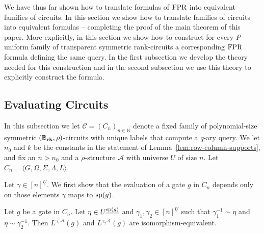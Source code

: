 \documentclass[../paper.tex]{subfiles}
\begin{document}
We have thus far shown how to translate formulas of $\text{\upshape FPR}$ into equivalent
families of circuits. In this section we show how to translate families of
circuits into equivalent formulas -- completing the proof of the main theorem of
this paper. More explicitly, in this section we show how to construct for every
$P$-uniform family of transparent symmetric rank-circuits a corresponding $\text{\upshape FPR}$
formula defining the same query. In the first subsection we develop the theory
needed for this construction and in the second subsection we use this theory to explicitly construct
the formula.


\subsection {Evaluating Circuits}
In this subsection we let $\mathcal{C} = (C_n)_{n \in \mathbb{N}}$ denote a
fixed family of polynomial-size symmetric $(\mathbb{B}_{\text{\textbf{rk}}},\rho)$-circuits with unique
labels that compute a $q$-ary query. We let $n_0$ and $k$ be the constants in
the statement of Lemma~\ref{lem:row-column-supports}, and fix an $n > n_0$ and a
$\rho$-structure $\mathcal{A}$ with universe $U$ of size $n$. Let $C_n = \langle
G, \Omega, \Sigma, \Lambda, L \rangle$.

Let $\gamma \in [n]^{\underline{U}}$. We first show that the evaluation of a
gate $g$ in $C_n$ depends only on those elements $\gamma$ maps to $\text{sp}(g)$.

\begin{lem}
	Let $g$ be a gate in $C_n$. Let $\eta \in U^{\underline{\text{sp}(g)}}$ and
  $\gamma_1, \gamma_2 \in [n]^{\underline{U}}$ such that $\gamma^{-1}_1 \sim
  \eta$ and $\eta \sim \gamma^{-1}_2$. Then $L^{\gamma_1 \mathcal{A}}(g)$ and
  $L^{\gamma_2 \mathcal{A}}(g)$ are isomorphism-equivalent.
	\label{lem:support-determines-evaluation}
\end{lem}
\end{document}
